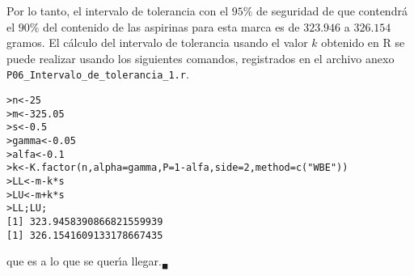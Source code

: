\begin{solucion}
 Por lo tanto, el intervalo de tolerancia con el $95\%$ de seguridad de que contendr\'a el $90\%$ del contenido de las aspirinas para esta marca es de $323.946$ a $326.154$ gramos. El c\'alculo del intervalo de tolerancia usando el valor $k$ obtenido en R se puede realizar usando los siguientes comandos, registrados en el archivo anexo \texttt{P06\_Intervalo\_de\_tolerancia\_1.r}.
 \begin{verbatim}
>n<-25
>m<-325.05
>s<-0.5
>gamma<-0.05
>alfa<-0.1
>k<-K.factor(n,alpha=gamma,P=1-alfa,side=2,method=c("WBE"))
>LL<-m-k*s
>LU<-m+k*s
>LL;LU;
[1] 323.9458390866821559939
[1] 326.1541609133178667435
 \end{verbatim}
 \vspace{-0.5cm}
 que es a lo que se quer\'{\i}a llegar.${}_{\blacksquare}$
\end{solucion}
